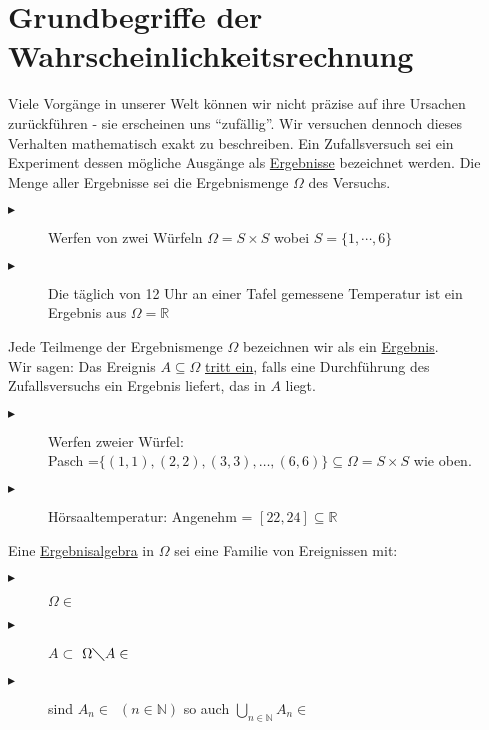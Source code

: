 \section{Grundbegriffe der Wahrscheinlichkeitsrechnung}

Viele Vorgänge in unserer Welt können wir nicht präzise auf ihre Ursachen zurückführen - sie erscheinen uns "`zufällig"'. Wir versuchen dennoch dieses Verhalten mathematisch exakt zu beschreiben. 
%
%
%
Ein Zufallsversuch sei ein Experiment dessen mögliche Ausgänge als \underline{Ergebnisse} bezeichnet werden. Die Menge aller Ergebnisse sei die Ergebnismenge $\Omega$ des Versuchs.
%
%
%
\bsp
\begin{description}
	\item[$\blacktriangleright$] Werfen von zwei Würfeln $\Omega = S \times S$ wobei 
			$S=\{1,\cdots,6\}$
	\item[$\blacktriangleright$] Die täglich von 12 Uhr an einer Tafel gemessene Temperatur
			ist ein Ergebnis aus $\Omega = \mathbb{R}$
\end{description}
%
%
%
Jede Teilmenge der Ergebnismenge $\Omega$ bezeichnen wir als ein \underline{Ergebnis}.\\
Wir sagen: Das Ereignis $A \subseteq \Omega$ \underline{tritt ein}, falls eine Durchführung des Zufallsversuchs ein Ergebnis liefert, das in $A$ liegt. 
%
%
%
\bsp
\begin{description}
	\item[$\blacktriangleright$] Werfen zweier Würfel:\\
			Pasch =$ \{ (1,1),(2,2),(3,3),\dotsc,(6,6)\} \subseteq \Omega = S \times S$ wie 
			oben.
	\item[$\blacktriangleright$] Hörsaaltemperatur: Angenehm = $ [22,24] \subseteq 
			\mathbb{R}$
\end{description}
%
%
%
Eine \underline{Ergebnisalgebra} in $\Omega$ sei eine Familie von Ereignissen mit: \begin{description}
	\item[$\blacktriangleright$] $\Omega \in$ 
	\item[$\blacktriangleright$] $A\subset$  $\Omega \diagdown A \in$  \normalfont{}
	\item[$\blacktriangleright$] sind $A_{n} \in $\, \normalfont{} 		
			$(n\in\mathbb{N})$ so auch 
			$\mathop{\bigcup}\limits_{n\in\mathbb{N}}A_{n} \in$ \,
			\normalfont{}
			
\end{description}

